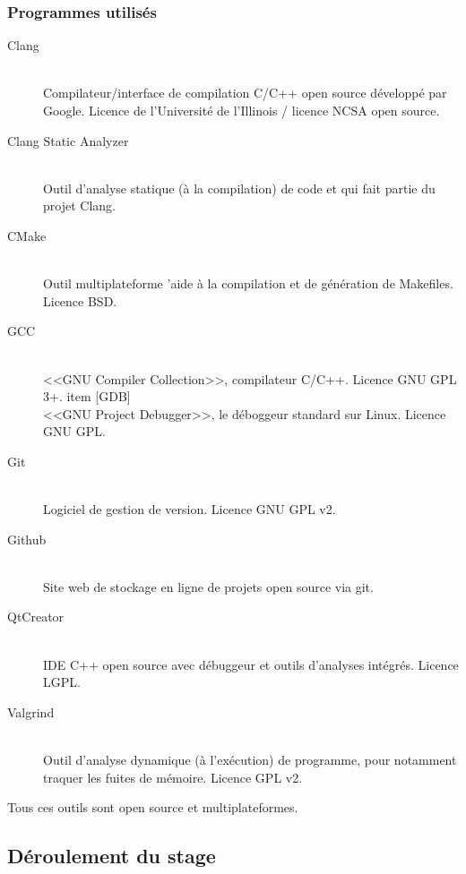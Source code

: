 \documentclass[a4paper,french,12pt]{article}
\begin{document}
		
		
		\subsubsection{Programmes utilisés}
		  \begin{description}  
		   \item [Clang]~\\
		      Compilateur/interface de compilation C/C++ open source développé par Google.
		      Licence de l'Université de l'Illinois / licence  NCSA open source.
		  \item [Clang Static Analyzer]~\\
		      Outil d'analyse statique (à la compilation) de code et qui fait partie du projet Clang. 
		  \item [CMake]~\\
		      Outil multiplateforme 'aide à la compilation et de génération de Makefiles.
		      Licence BSD.
		   \item [GCC]~\\
		      <<GNU Compiler Collection>>, compilateur C/C++.
		      Licence GNU GPL 3+.      
		   item [GDB]~\\
		      <<GNU Project Debugger>>, le déboggeur standard sur Linux.
		      Licence GNU GPL.
		   \item [Git]~\\
		      Logiciel de gestion de version.
		      Licence GNU GPL v2.    
		   \item [Github]~\\
		      Site web de stockage en ligne de projets open source via git.	      
		    \item [QtCreator]~\\
		      IDE C++ open source avec débuggeur et outils d'analyses intégrés.
		      Licence LGPL.
		      
		   \item [Valgrind]~\\
		      Outil d'analyse dynamique (à l'exécution) de programme, pour notamment traquer les fuites de mémoire.
		      Licence GPL v2.
		  \end{description}

		Tous ces outils sont open source et multiplateformes.
		
	\subsection{Déroulement du stage}
	
\end{document}
